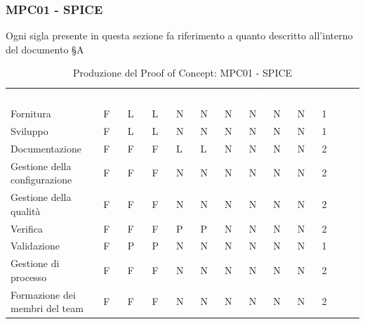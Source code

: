 \subsubsection{MPC01 - SPICE}
Ogni sigla presente in questa sezione fa riferimento a quanto descritto all'interno del documento \textit{\NdP} §A


\begin{table}[H]
        \renewcommand{\arraystretch}{1.5}
        \begin{tabular}{ m{}<{\centering}  m{}<{\centering} m{}<{\centering} m{}<{\centering} m{}<{\centering} m{}<{\centering} m{}<{\centering} m{}<{\centering} m{}<{\centering} m{}<{\centering} m{}<{\centering}}
	\rowcolor{darkblue}
	\textcolor{white}{\textbf{Processo}} &\textcolor{white}{\textbf{1.1}} &\textcolor{white}{\textbf{2.1}} &\textcolor{white}{\textbf{2.2}} &\textcolor{white}{\textbf{3.1}} &\textcolor{white}{\textbf{3.2}} &\textcolor{white}{\textbf{4.1}} &\textcolor{white}{\textbf{4.2}} &\textcolor{white}{\textbf{5.1}} &\textcolor{white}{\textbf{5.2}} &\textcolor{white}{\textbf{Livello}}\\ 


	Fornitura & F & L & L & N & N & N & N & N & N & 1 \\
    Sviluppo & F & L & L & N & N & N & N & N & N & 1 \\
    Documentazione & F & F & F & L & L & N & N & N & N & 2 \\
    Gestione della configurazione & F & F & F & N & N & N & N & N & N & 2 \\
    Gestione della qualità & F & F & F & N & N & N & N & N & N & 2 \\
    Verifica & F & F & F & P & P & N & N & N & N & 2 \\
   Validazione & F & P & P & N & N & N & N & N & N & 1 \\
    Gestione di processo & F & F & F & N & N & N & N & N & N & 2 \\
    Formazione dei membri del team & F & F & F & N & N & N & N & N & N & 2 \\
    
\end{tabular}       
\caption{Produzione del Proof of Concept: MPC01 - SPICE}
\end{table}

